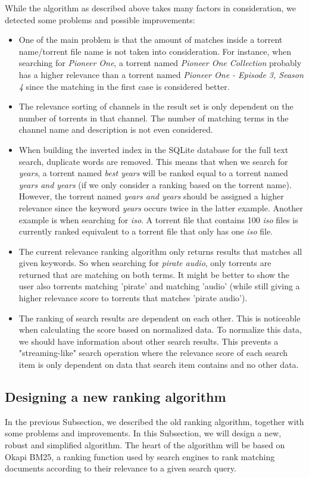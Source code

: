 While the algorithm as described above takes many factors in consideration, we detected some problems and possible improvements:
\begin{itemize}
	\item One of the main problem is that the amount of matches inside a torrent name/torrent file name is not taken into consideration. For instance, when searching for \emph{Pioneer One}, a torrent named \emph{Pioneer One Collection} probably has a higher relevance than a torrent named \emph{Pioneer One - Episode 3, Season 4} since the matching in the first case is considered better.
	\item The relevance sorting of channels in the result set is only dependent on the number of torrents in that channel. The number of matching terms in the channel name and description is not even considered.
	\item When building the inverted index in the SQLite database for the full text search, duplicate words are removed. This means that when we search for \emph{years}, a torrent named \emph{best years} will be ranked equal to a torrent named \emph{years and years} (if we only consider a ranking based on the torrent name). However, the torrent named \emph{years and years} should be assigned a higher relevance since the keyword \emph{years} occurs twice in the latter example. Another example is when searching for \emph{iso}. A torrent file that contains 100 \emph{iso} files is currently ranked equivalent to a torrent file that only has one \emph{iso} file.
	\item The current relevance ranking algorithm only returns results that matches all given keywords. So when searching for \emph{pirate audio}, only torrents are returned that are matching on both terms. It might be better to show the user also torrents matching 'pirate' and matching 'audio' (while still giving a higher relevance score to torrents that matches 'pirate audio').
	\item The ranking of search results are dependent on each other. This is noticeable when calculating the score based on normalized data. To normalize this data, we should have information about other search results. This prevents a "streaming-like" search operation where the relevance score of each search item is only dependent on data that search item contains and no other data.
\end{itemize}

\subsection{Designing a new ranking algorithm}
In the previous Subsection, we described the old ranking algorithm, together with some problems and improvements. In this Subsection, we will design a new, robust and simplified algorithm. The heart of the algorithm will be based on Okapi BM25, a ranking function used by search engines to rank matching documents according to their relevance to a given search query.

